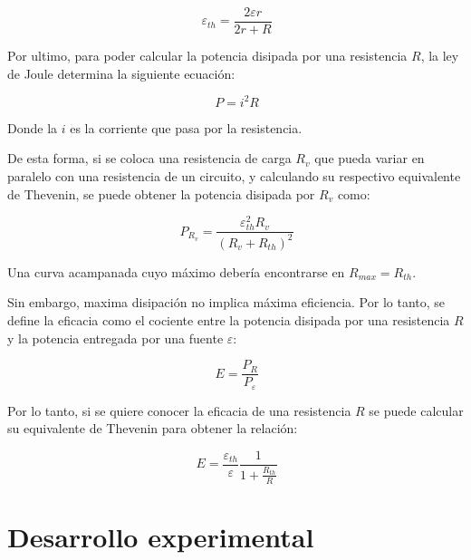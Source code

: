 \documentclass[11pt,a4paper]{article}
\begin{document}
\begin{equation}\label{Eth}
\ \varepsilon_{th}= \frac{2\varepsilon r}{2r+R}
\end{equation}

Por ultimo, para poder calcular la potencia disipada por una resistencia $R$, la ley de Joule \cite{Trelles} determina la siguiente ecuación:

\begin{equation}\label{Joule}
\ P = i^2 R
\end{equation}

Donde la $i$ es la corriente que pasa por la resistencia. 

De esta forma, si se coloca una resistencia de carga $R_{v}$ que pueda variar en paralelo con una resistencia de un circuito, y calculando su respectivo equivalente de Thevenin, se puede obtener la potencia disipada por $R_{v}$ como:

\begin{equation}\label{Pot}
\ P_{R_{v}}=\frac{\varepsilon_{th}^2 R_{v}}{(R_{v}+R_{th})^2}
\end{equation}

Una curva acampanada cuyo máximo debería encontrarse en $R_{max} = R_{th}$.

Sin embargo, maxima disipación no implica máxima eficiencia. Por lo tanto, se define la eficacia como el cociente entre la potencia disipada por una resistencia $R$ y la potencia entregada por una fuente $\varepsilon$:

\begin{equation}\label{eficacia}
\ E=\frac{P_{R}}{P_{\varepsilon}}
\end{equation}

Por lo tanto, si se quiere conocer la eficacia de una resistencia $R$ se puede calcular su equivalente de Thevenin para obtener la relación:

\begin{equation}\label{efi}
\ E= \frac{\varepsilon_{th}}{\varepsilon}\frac{1}{1+\frac{R_{th}}{R}}
\end{equation}


\section{Desarrollo experimental}
\end{document}
